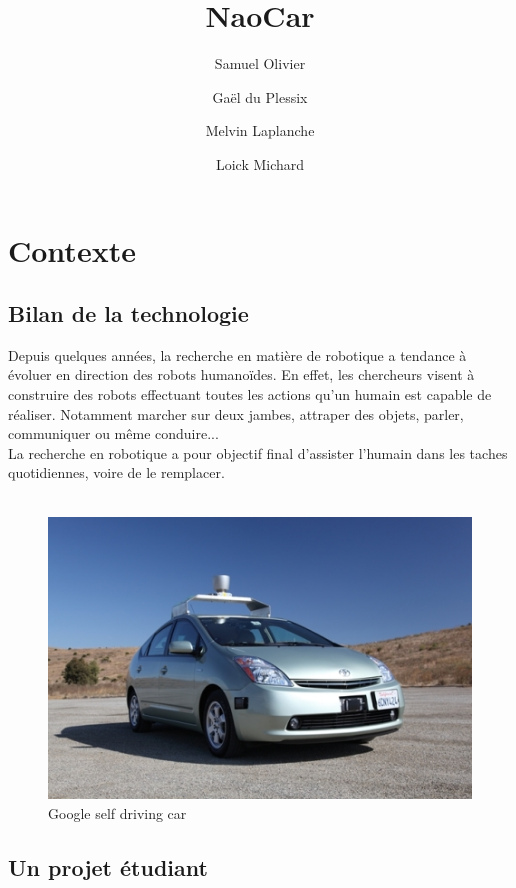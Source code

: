 \documentclass[11pt]{report} %
\title{NaoCar}
\author{Samuel Olivier\and
Gaël du Plessix\and
Melvin Laplanche\and
Loick Michard}
\begin{document}
\maketitle
\tableofcontents

\chapter{Contexte}
	\section{Bilan de la technologie}
		Depuis quelques années, la recherche en matière de robotique a tendance à évoluer en direction des robots humanoïdes.
		En effet, les chercheurs visent à construire des robots effectuant toutes les actions qu'un humain est capable de réaliser.
		Notamment marcher sur deux jambes, attraper des objets, parler, communiquer ou même conduire...\\
		La recherche en robotique a pour objectif final d'assister l'humain dans les taches quotidiennes, voire de le remplacer.\\\\
		\begin{figure}[htb]
			\centering
			\includegraphics[scale=1]{google-car.jpeg}
			\caption{Google self driving car}
			\label{fig:google-car}
		\end{figure}
	\newpage
	\section{Un projet étudiant}
\end{document}
